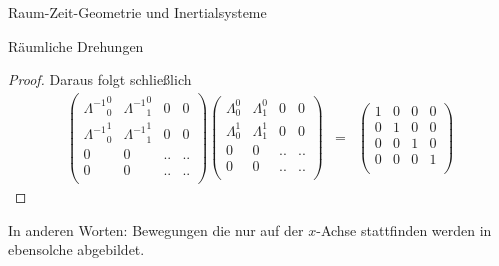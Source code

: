 \begin{chapter}{\titlestr}
\begin{section}{Raum-Zeit-Geometrie und Inertialsysteme}
\begin{subsection}{Räumliche Drehungen}
\begin{proof}
Daraus folgt schließlich
\begin{eqnarray*}
\begin{pmatrix}
{\Lambda^{-1}}^0_0 &{\Lambda^{-1}}^0_1&0&0\\
{\Lambda^{-1}}^1_0 &{\Lambda^{-1}}^1_1&0&0\\
0&0&..&..\\
0&0&..&..\\
\end{pmatrix}
\begin{pmatrix}
\Lambda^0_0 &\Lambda^0_1&0&0\\
\Lambda^1_0 &\Lambda^1_1&0&0\\
0&0&..&..\\
0&0&..&..\\
\end{pmatrix}
&=&
\begin{pmatrix}
1 &0&0&0\\
0&1&0&0\\
0&0&1&0\\
0&0&0&1\\
\end{pmatrix}
\end{eqnarray*}
\end{proof}
In anderen Worten: Bewegungen die nur auf der $x$-Achse stattfinden werden in ebensolche abgebildet.
\end{subsection}


\end{section}
\end{chapter}
